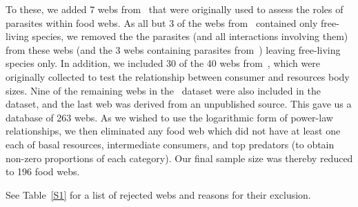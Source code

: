 \documentclass[12pt]{article}
\begin{document}
  To these, we added 7 webs from~\citet{Dunne2013} that were originally used
  to assess the roles of parasites within food webs. As all but 3 of the webs
  from~\citet{GlobalWeb} contained only free-living species, we removed the
  the parasites (and all interactions involving them) from these webs (and the
  3 webs containing parasites from~\citet{GlobalWeb}) leaving free-living
  species only. In addition, we included 30 of the 40 webs
  from~\citet{Riede2011}, which were originally collected to test the
  relationship between consumer and resources body sizes. Nine of the
  remaining webs in the~\citet{Riede2011} dataset were also included in
  the~\citet{GlobalWeb}  dataset, and the last web was derived from an
  unpublished source. This gave us a database of 263 webs. As we wished to use
  the logarithmic form of power-law relationships, we then eliminated any food
  web which did not have at least one each of basal resources, intermediate
  consumers, and top predators (to obtain  non-zero proportions of each
  category). Our final sample size was thereby reduced to 196 food webs.



 See Table~\ref{S1} for a list of rejected webs and reasons for their
  exclusion. 
\end{document}
